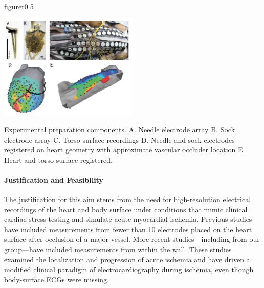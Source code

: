 \begin{wrapfloat}{figure}{r}{0.5\textwidth}
    \vspace{-.3in}
    \begin{center}
        {\includegraphics[width=0.5\textwidth]
          {../Figures/fig1.png}}
        \captionsetup{width = 0.5\textwidth}
        \caption{\small \label{fig:prep} Experimental preparation
          components. A. Needle electrode array B. Sock electrode array
          C. Torso surface recordings D. Needle and sock electrodes
          registered on heart geometry with approximate vascular occluder
          location E. Heart and torso surface registered.}
    \end{center}
    \vspace{-.4in}
\end{wrapfloat}

\paragraph{Justification and Feasibility} The justification for this aim
stems from the need for high-resolution electrical recordings of the heart
and body surface under conditions that mimic clinical cardiac stress
testing and simulate acute myocardial ischemia.  Previous studies have
included measurements from fewer than 10 electrodes placed on the heart
surface after occlusion of a major
vessel.\cite{BMB:Hol77a,BMB:Hol77b,BLZ:Kle1978,BLZ:Jan1980} More recent
studies---including from our group---have included measurements from within
the wall.\cite{RSM:Cha89,RSM:Mac95e,RSM:Mac97} These studies
examined the localization and progression of acute ischemia and have
driven a modified clinical paradigm of electrocardiography during ischemia, even
though body-surface ECGs were missing.


